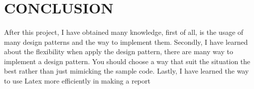 \section{CONCLUSION}

\paragraph{}
After this project, I have obtained many knowledge, first of all, is the usage of many design patterns and the way to implement them. Secondly, I have learned about the flexibility when apply the design pattern, there are many way to implement a design pattern. You should choose a way that suit the situation the best rather than just mimicking the sample code. Lastly, I have learned the way to use Latex more efficiently in making a report
